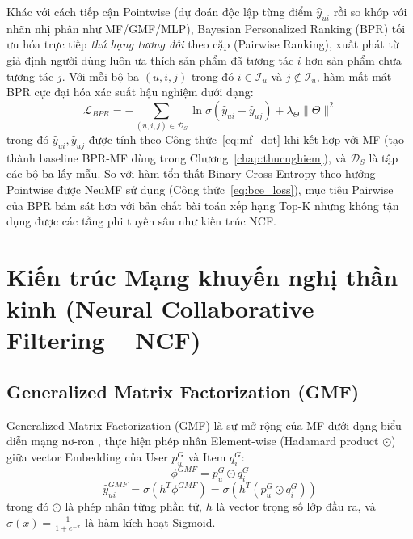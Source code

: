 Khác với cách tiếp cận Pointwise (dự đoán độc lập từng điểm $\hat{y}_{ui}$ rồi so khớp với nhãn nhị phân như MF/GMF/MLP), Bayesian Personalized Ranking (BPR) \parencite{rendle2009bpr} tối ưu hóa trực tiếp \emph{thứ hạng tương đối} theo cặp (Pairwise Ranking), xuất phát từ giả định người dùng luôn ưa thích sản phẩm đã tương tác $i$ hơn sản phẩm chưa tương tác $j$. Với mỗi bộ ba $(u, i, j)$ trong đó $i \in \mathcal{I}_u$ và $j \notin \mathcal{I}_u$, hàm mất mát BPR cực đại hóa xác suất hậu nghiệm dưới dạng:
\begin{equation}
    \mathcal{L}_{BPR} = -\sum_{(u,i,j) \in \mathcal{D}_S} \ln \sigma\left(\hat{y}_{ui} - \hat{y}_{uj}\right) + \lambda_\Theta \lVert \Theta \rVert^2
    \label{eq:bpr_loss}
\end{equation}
trong đó $\hat{y}_{ui}, \hat{y}_{uj}$ được tính theo Công thức~\eqref{eq:mf_dot} khi kết hợp với MF (tạo thành baseline BPR-MF dùng trong Chương~\ref{chap:thucnghiem}), và $\mathcal{D}_S$ là tập các bộ ba lấy mẫu. So với hàm tổn thất Binary Cross-Entropy theo hướng Pointwise được NeuMF sử dụng (Công thức~\eqref{eq:bce_loss}), mục tiêu Pairwise của BPR bám sát hơn với bản chất bài toán xếp hạng Top-K nhưng không tận dụng được các tầng phi tuyến sâu như kiến trúc NCF.

\section{Kiến trúc Mạng khuyến nghị thần kinh (Neural Collaborative Filtering -- NCF)}
\label{sec:ncf_architecture}

\subsection{Generalized Matrix Factorization (GMF)}
\label{subsec:gmf}

Generalized Matrix Factorization (GMF) là sự mở rộng của MF dưới dạng biểu diễn mạng nơ-ron \parencite{he2017ncf}, thực hiện phép nhân Element-wise (Hadamard product $\odot$) giữa vector Embedding của User $p_u^G$ và Item $q_i^G$:
\begin{equation}
    \phi^{GMF} = p_u^G \odot q_i^G
    \label{eq:gmf_hadamard}
\end{equation}
\begin{equation}
    \hat{y}_{ui}^{GMF} = \sigma \left( h^T \phi^{GMF} \right) = \sigma \left( h^T (p_u^G \odot q_i^G) \right)
    \label{eq:gmf_predict}
\end{equation}
trong đó $\odot$ là phép nhân từng phần tử, $h$ là vector trọng số lớp đầu ra, và $\sigma(x) = \frac{1}{1 + e^{-x}}$ là hàm kích hoạt Sigmoid.

